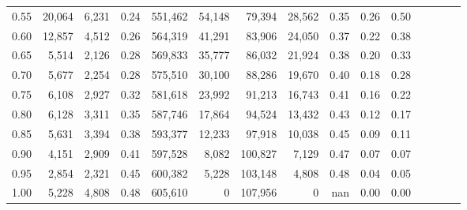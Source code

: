 \begin{tabular}{rrrcrrrrrrrrrrr}
0.55 &   20,064 &   6,231 &                                       0.24 &  551,462 &   54,148 &   79,394 &   28,562 &  0.35 &  0.26 &                         0.50 \\
0.60 &   12,857 &   4,512 &                                       0.26 &  564,319 &   41,291 &   83,906 &   24,050 &  0.37 &  0.22 &                         0.38 \\
0.65 &    5,514 &   2,126 &                                       0.28 &  569,833 &   35,777 &   86,032 &   21,924 &  0.38 &  0.20 &                         0.33 \\
0.70 &    5,677 &   2,254 &                                       0.28 &  575,510 &   30,100 &   88,286 &   19,670 &  0.40 &  0.18 &                         0.28 \\
0.75 &    6,108 &   2,927 &                                       0.32 &  581,618 &   23,992 &   91,213 &   16,743 &  0.41 &  0.16 &                         0.22 \\
0.80 &    6,128 &   3,311 &                                       0.35 &  587,746 &   17,864 &   94,524 &   13,432 &  0.43 &  0.12 &                         0.17 \\
0.85 &    5,631 &   3,394 &                                       0.38 &  593,377 &   12,233 &   97,918 &   10,038 &  0.45 &  0.09 &                         0.11 \\
0.90 &    4,151 &   2,909 &                                       0.41 &  597,528 &    8,082 &  100,827 &    7,129 &  0.47 &  0.07 &                         0.07 \\
0.95 &    2,854 &   2,321 &                                       0.45 &  600,382 &    5,228 &  103,148 &    4,808 &  0.48 &  0.04 &                         0.05 \\
1.00 &    5,228 &   4,808 &                                       0.48 &  605,610 &        0 &  107,956 &        0 &   nan &  0.00 &                         0.00 \\
\bottomrule
\end{tabular}
